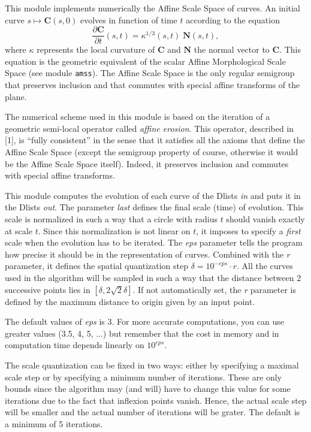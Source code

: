 This module implements numerically the Affine Scale Space of curves.
An initial curve $s\mapsto {\mathbf C}(s,0)$ evolves in function 
of time $t$ according to the 
equation
$$\frac{\partial {\mathbf C}}{\partial t}(s,t) 
= \kappa^{1/3}(s,t) \; {\mathbf N}(s,t),$$
where $\kappa$ represents the local curvature of $\mathbf C$ and
$\mathbf N$ the normal vector to $\mathbf C$. This equation is
the geometric equivalent of the scalar Affine Morphological Scale
Space (see module \verb+amss+).
The Affine Scale Space is the only regular semigroup that preserves 
inclusion and that commutes with special affine transforms of the plane.

\medskip

The numerical scheme used in this module is based on the iteration
of a geometric semi-local operator called {\em affine erosion}.
This operator, described in [1], is ``fully consistent'' in the
sense that it satisfies all the axioms that define the Affine Scale
Space (except the semigroup property of course, otherwise it would be
the Affine Scale Space itself). Indeed, it preserves inclusion
and commutes with special affine transforms.

\medskip

This module computes the evolution of each curve of the Dlists {\em in}
and puts it in the Dlists {\em out}.
The parameter {\em last} defines the final scale (time) of evolution.
This scale is normalized in such a way that a circle with radius $t$
should vanish exactly at scale $t$. Since this normalization is not 
linear on $t$, it imposes to specify a {\em first} scale when the 
evolution has to be iterated. The {\em eps} parameter tells the program
how precise it should be in the representation of curves. Combined
with the {\em r} parameter, it defines the spatial quantization step
$\delta = 10^{-eps} \cdot r$. 
All the curves used in the algorithm will
be sampled in such a way that the distance between 2 successive points
lies in $[\delta,2\sqrt 2\delta]$. If not automatically set, the {\em r}
parameter is defined by the maximum distance to origin given by an
input point.

The default values of {\em eps} is 3. For more accurate computations,
you can use greater values (3.5, 4, 5, ...) but remember that
the cost in memory and in computation time depends linearly on $10^{eps}$.

\medskip

The scale quantization can be fixed in two ways: either by specifying
a maximal scale step or by specifying a minimum number of iterations.
These are only bounds since the algorithm may (and will) have to change
this value for some iterations due to the fact that inflexion points
vanish. Hence, the actual scale step will be smaller and the actual
number of iterations will be grater. The default is a minimum of 5 iterations.

